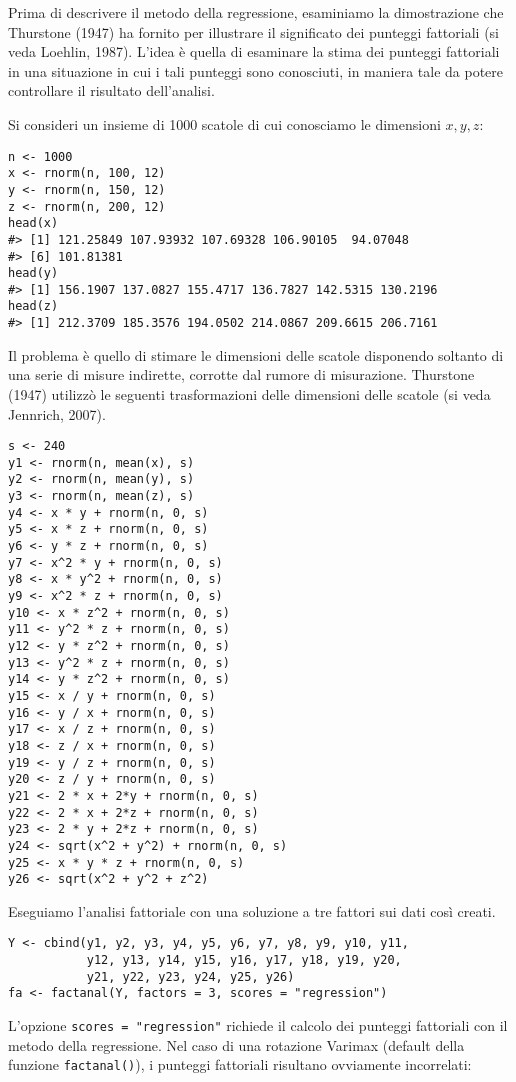 Prima di descrivere il metodo della regressione, esaminiamo la dimostrazione che Thurstone (1947) ha fornito per illustrare il significato dei punteggi fattoriali (si veda Loehlin, 1987). L'idea è quella di esaminare la stima dei punteggi fattoriali in una situazione in cui i tali punteggi sono conosciuti, in maniera tale da potere controllare il risultato dell'analisi.

Si consideri un insieme di 1000 scatole di cui conosciamo le dimensioni
$x, y, z$:

\begin{lstlisting}
n <- 1000
x <- rnorm(n, 100, 12)
y <- rnorm(n, 150, 12)
z <- rnorm(n, 200, 12)
head(x)
#> [1] 121.25849 107.93932 107.69328 106.90105  94.07048
#> [6] 101.81381
head(y)
#> [1] 156.1907 137.0827 155.4717 136.7827 142.5315 130.2196
head(z)
#> [1] 212.3709 185.3576 194.0502 214.0867 209.6615 206.7161
\end{lstlisting}
Il problema è quello di stimare le dimensioni delle scatole disponendo soltanto di una serie di misure indirette, corrotte dal rumore di misurazione. 
Thurstone (1947) utilizzò le seguenti trasformazioni delle dimensioni delle scatole (si veda Jennrich, 2007).

\begin{lstlisting}
s <- 240
y1 <- rnorm(n, mean(x), s)
y2 <- rnorm(n, mean(y), s)
y3 <- rnorm(n, mean(z), s)
y4 <- x * y + rnorm(n, 0, s)
y5 <- x * z + rnorm(n, 0, s)
y6 <- y * z + rnorm(n, 0, s)
y7 <- x^2 * y + rnorm(n, 0, s)
y8 <- x * y^2 + rnorm(n, 0, s)
y9 <- x^2 * z + rnorm(n, 0, s)
y10 <- x * z^2 + rnorm(n, 0, s)
y11 <- y^2 * z + rnorm(n, 0, s)
y12 <- y * z^2 + rnorm(n, 0, s)
y13 <- y^2 * z + rnorm(n, 0, s)
y14 <- y * z^2 + rnorm(n, 0, s)
y15 <- x / y + rnorm(n, 0, s)
y16 <- y / x + rnorm(n, 0, s)
y17 <- x / z + rnorm(n, 0, s)
y18 <- z / x + rnorm(n, 0, s)
y19 <- y / z + rnorm(n, 0, s)
y20 <- z / y + rnorm(n, 0, s)
y21 <- 2 * x + 2*y + rnorm(n, 0, s)
y22 <- 2 * x + 2*z + rnorm(n, 0, s)
y23 <- 2 * y + 2*z + rnorm(n, 0, s)
y24 <- sqrt(x^2 + y^2) + rnorm(n, 0, s)
y25 <- x * y * z + rnorm(n, 0, s)
y26 <- sqrt(x^2 + y^2 + z^2)
\end{lstlisting}
Eseguiamo l'analisi fattoriale con una soluzione a tre fattori sui
dati così creati.

\begin{lstlisting}
Y <- cbind(y1, y2, y3, y4, y5, y6, y7, y8, y9, y10, y11, 
           y12, y13, y14, y15, y16, y17, y18, y19, y20, 
           y21, y22, y23, y24, y25, y26)
fa <- factanal(Y, factors = 3, scores = "regression")
\end{lstlisting}
L'opzione {\tt  scores = "regression"} richiede il calcolo dei
punteggi fattoriali con il metodo della regressione.  
Nel caso di una rotazione Varimax (default della funzione {\tt factanal()}), i punteggi fattoriali risultano ovviamente incorrelati:

